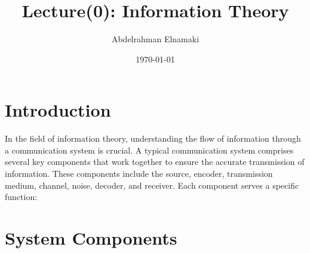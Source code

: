\documentclass{article}
\title{Lecture(0): Information Theory}
\author{Abdelrahman Elnamaki}
\date{\today}
\begin{document}
\maketitle

\section*{Introduction}
In the field of information theory, understanding the flow of information through a communication system is crucial. A typical communication system comprises several key components that work together to ensure the accurate transmission of information. These components include the source, encoder, transmission medium, channel, noise, decoder, and receiver. Each component serves a specific function:

\section{System Components}
\end{document}
